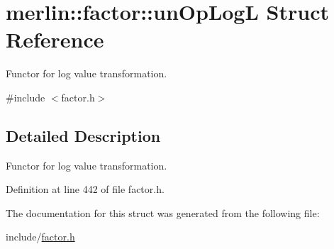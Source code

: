\hypertarget{structmerlin_1_1factor_1_1unOpLogL}{}\section{merlin\+:\+:factor\+:\+:un\+Op\+Log\+L Struct Reference}
\label{structmerlin_1_1factor_1_1unOpLogL}


Functor for log value transformation.  




{\ttfamily \#include $<$factor.\+h$>$}



\subsection{Detailed Description}
Functor for log value transformation. 

Definition at line 442 of file factor.\+h.



The documentation for this struct was generated from the following file\+:\begin{DoxyCompactItemize}
\item 
include/\hyperlink{factor_8h}{factor.\+h}\end{DoxyCompactItemize}
